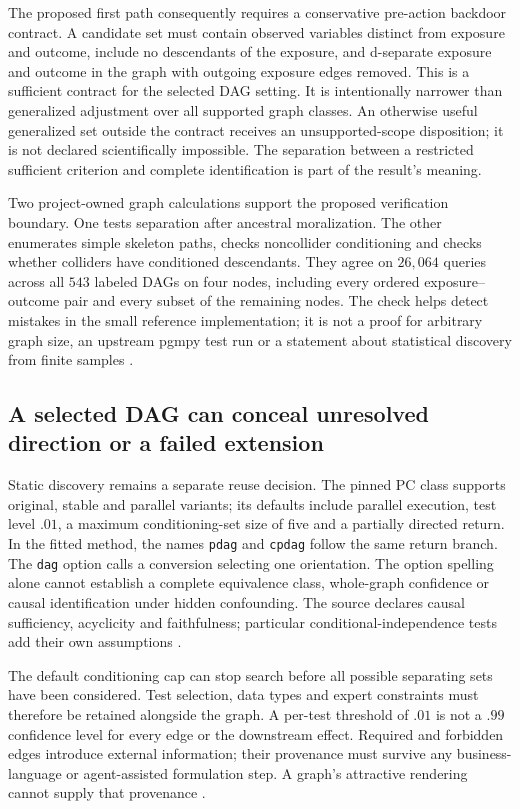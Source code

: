 The proposed first path consequently requires a conservative pre-action
backdoor contract. A candidate set must contain observed variables distinct
from exposure and outcome, include no descendants of the exposure, and
d-separate exposure and outcome in the graph with outgoing exposure edges
removed. This is a sufficient contract for the selected DAG setting. It
is intentionally narrower than generalized adjustment over all supported
graph classes. An otherwise useful generalized set outside the contract
receives an unsupported-scope disposition; it is not declared scientifically
impossible. The separation between a restricted sufficient criterion and
complete identification is part of the result's meaning.

Two project-owned graph calculations support the proposed verification
boundary. One tests separation after ancestral moralization. The other
enumerates simple skeleton paths, checks noncollider conditioning and checks
whether colliders have conditioned descendants. They agree on $26{,}064$
queries across all $543$ labeled DAGs on four nodes, including every ordered
exposure--outcome pair and every subset of the remaining nodes. The check
helps detect mistakes in the small reference implementation; it is not a
proof for arbitrary graph size, an upstream pgmpy test run or a statement
about statistical discovery from finite samples
\citep{exec13_pgmpy_reuse_oracle}.

\subsection{A selected DAG can conceal unresolved direction or a failed extension}

Static discovery remains a separate reuse decision. The pinned PC class
supports original, stable and parallel variants; its defaults include
parallel execution, test level $.01$, a maximum conditioning-set size of
five and a partially directed return. In the fitted method, the names
\texttt{pdag} and \texttt{cpdag} follow the same return branch.
The \texttt{dag} option calls a conversion selecting one orientation.
The option spelling alone cannot establish a complete equivalence class,
whole-graph confidence or causal identification under hidden confounding.
The source declares causal sufficiency, acyclicity and faithfulness;
particular conditional-independence tests add their own assumptions
\citep{exec13_pgmpy_reuse_primary}.

The default conditioning cap can stop search before all possible separating
sets have been considered. Test selection, data types and expert constraints
must therefore be retained alongside the graph. A per-test threshold of
$.01$ is not a $.99$ confidence level for every edge or the downstream
effect. Required and forbidden edges introduce external information;
their provenance must survive any business-language or agent-assisted
formulation step. A graph's attractive rendering cannot supply that
provenance \citep{exec13_pgmpy_reuse_primary}.

